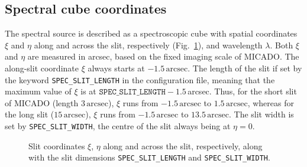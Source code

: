 \documentclass[a4paper,twoside,11pt]{article}
\begin{document}
\subsection{Spectral cube coordinates}
\label{ssec:cube_coordinates}

The spectral source is described as a spectroscopic cube with spatial
coordinates $\xi$ and $\eta$ along and across the slit, respectively
(Fig.~\ref{fig:slit_coords}), and wavelength $\lambda$. Both $\xi$ and
$\eta$ are measured in arcsec, based on the fixed imaging scale of
MICADO. The along-slit coordinate $\xi$ always starts at
$-1.5\,\mathrm{arcsec}$. The length of the slit if set by the keyword
\lstinline{SPEC_SLIT_LENGTH} in the configuration file, meaning that
the maximum value of $\xi$ is at
$\mathtt{SPEC\_SLIT\_LENGTH} - 1.5$\,arcsec. Thus, for the short slit
of MICADO (length $3\,\mathrm{arcsec}$), $\xi$ runs from
$-1.5\,\mathrm{arcsec}$ to $1.5\,\mathrm{arcsec}$, whereas for the
long slit ($15\,\mathrm{arcsec}$), $\xi$ runs from
$-1.5\,\mathrm{arcsec}$ to $13.5\,\mathrm{arcsec}$. The slit width is
set by \lstinline{SPEC_SLIT_WIDTH}, the centre of the slit always
being at $\eta=0$.

\begin{figure}[b]
  \centering
  \caption{Slit coordinates $\xi$, $\eta$ along and across the slit,
    respectively, along with the slit dimensions
    \lstinline{SPEC_SLIT_LENGTH} and \lstinline{SPEC_SLIT_WIDTH}.}
  \label{fig:slit_coords}
\end{figure}
\end{document}
